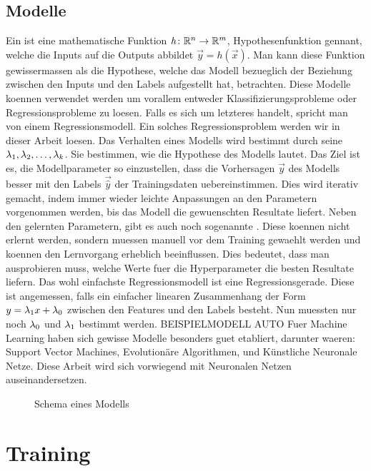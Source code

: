 \subsection{Modelle}
Ein  ist eine mathematische Funktion $\mathit{h}\colon \mathbb{R}^n
\to \mathbb{R}^m$, Hypothesenfunktion gennant, welche die Inputs auf die Outputs abbildet $\vec{y}=\mathit{h}(\vec{x})$.
Man kann diese Funktion gewissermassen als die Hypothese, welche das Modell bezueglich der Beziehung zwischen
den Inputs und den Labels aufgestellt hat, betrachten.
Diese Modelle koennen verwendet werden um vorallem entweder
Klassifizierungsprobleme oder Regressionsprobleme zu loesen. Falls es sich um
letzteres handelt, spricht man von einem Regressionsmodell. Ein solches
Regressionsproblem werden wir in dieser Arbeit loesen.
\para{}
Das Verhalten eines Modells wird bestimmt durch seine 
$\lambda_1, \lambda_2,\ldots,\lambda_k$. Sie bestimmen, wie die Hypothese des Modells lautet.
Das Ziel ist es, die Modellparameter so einzustellen, dass die Vorhersagen
$\vec{y}$ des Modells besser mit den Labels $\vec{\hat{y}}$ der Trainingsdaten uebereinstimmen.
Dies wird iterativ gemacht, indem immer wieder leichte Anpassungen an den
Parametern vorgenommen werden, bis das Modell die gewuenschten Resultate liefert.
\para{}
Neben den gelernten Parametern, gibt es auch noch sogenannte .
Diese koennen nicht erlernt werden, sondern muessen manuell vor dem Training gewaehlt werden und koennen den Lernvorgang erheblich beeinflussen.
Dies bedeutet, dass man ausprobieren muss, welche Werte fuer die Hyperparameter
die besten Resultate liefern.
\para{}
Das wohl einfachste Regressionsmodell ist eine Regressionsgerade. Diese ist
angemessen, falls ein einfacher linearen Zusammenhang der Form $y=\lambda_1x +
\lambda_0$ zwischen den Features und den Labels besteht.
Nun muessten nur noch $\lambda_0$ und $\lambda_1$ bestimmt werden.
BEISPIELMODELL AUTO
\para{}
Fuer Machine Learning haben sich gewisse Modelle besonders guet etabliert,
darunter waeren: Support Vector Machines, Evolutionäre Algorithmen, und Künstliche Neuronale Netze.
Diese Arbeit wird sich vorwiegend mit Neuronalen Netzen auseinandersetzen.
\\
\begin{figure}[h!]
  \centering


  \caption{Schema eines Modells}
\end{figure}

\section{Training}
